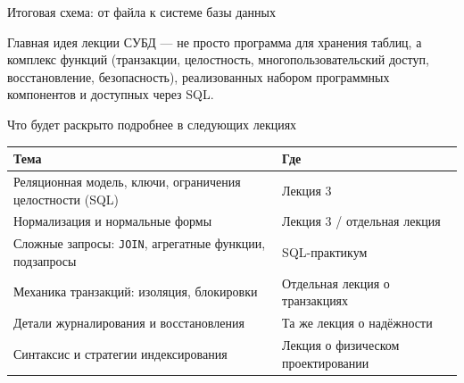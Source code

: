 \documentclass[aspectratio=169]{beamer}
\begin{document}
\begin{frame}{Итоговая схема: от файла к системе базы данных}

\begin{center}
\end{center}

\vspace{0.4cm}

\begin{alertblock}{Главная идея лекции}
СУБД — не просто программа для хранения таблиц,
а комплекс функций (транзакции, целостность,
многопользовательский доступ, восстановление,
безопасность), реализованных набором программных
компонентов и доступных через SQL.
\end{alertblock}

\end{frame}


\begin{frame}{Что будет раскрыто подробнее в следующих лекциях}

\small
\begin{table}
\centering
\begin{tabular}{p{}|p{}}
\toprule
\textbf{Тема} & \textbf{Где}\\
\midrule
Реляционная модель, ключи, ограничения целостности (SQL) & Лекция 3\\
Нормализация и нормальные формы & Лекция 3 / отдельная лекция\\
Сложные запросы: \texttt{JOIN}, агрегатные функции, подзапросы & SQL-практикум\\
Механика транзакций: изоляция, блокировки & Отдельная лекция о транзакциях\\
Детали журналирования и восстановления & Та же лекция о надёжности\\
Синтаксис и стратегии индексирования & Лекция о физическом проектировании\\
\bottomrule
\end{tabular}
\end{table}

\end{frame}
\end{document}
